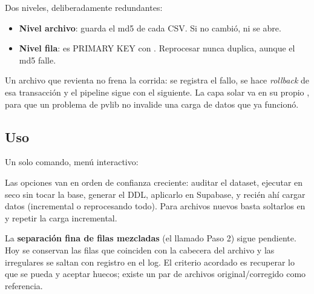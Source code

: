 Dos niveles, deliberadamente redundantes:

\begin{itemize}[leftmargin=*,itemsep=2pt]
  \item \textbf{Nivel archivo}:  guarda el md5 de cada CSV. Si no
    cambió, ni se abre.
  \item \textbf{Nivel fila}:  es PRIMARY KEY con
    . Reprocesar nunca duplica, aunque el md5 falle.
\end{itemize}

Un archivo que revienta no frena la corrida: se registra el fallo, se hace \emph{rollback}
de esa transacción y el pipeline sigue con el siguiente. La capa solar va en su propio
, para que un problema de pvlib no invalide una carga de datos que ya funcionó.

\subsection{Uso}

Un solo comando, menú interactivo:

\begin{center}\end{center}

Las opciones van en orden de confianza creciente: auditar el dataset, ejecutar en seco
sin tocar la base, generar el DDL, aplicarlo en Supabase, y recién ahí cargar datos
(incremental o reprocesando todo). Para archivos nuevos basta soltarlos en
 y repetir la carga incremental.

\begin{aviso}[title=Lo que este ETL todavía no hace]
La \textbf{separación fina de filas mezcladas} (el llamado Paso 2) sigue pendiente. Hoy
se conservan las filas que coinciden con la cabecera del archivo y las irregulares se
saltan con registro en el log. El criterio acordado es recuperar lo que se pueda y
aceptar huecos; existe un par de archivos original/corregido como referencia.
\end{aviso}
